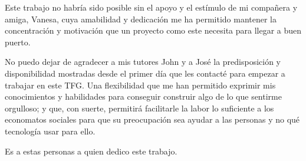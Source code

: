 \thispagestyle{empty}
\vspace{1cm}

\par Este trabajo no habría sido posible sin el apoyo y el estímulo de mi compañera y amiga, Vanesa, cuya amabilidad y dedicación me ha permitido mantener la concentración y motivación que un proyecto como este necesita para llegar a buen puerto.
\vspace{1em}
\par No puedo dejar de agradecer a mis tutores John y a José la predisposición y disponibilidad mostradas desde el primer día que les contacté para empezar a trabajar en este TFG. Una flexibilidad que me han permitido exprimir mis conocimientos y habilidades para conseguir construir algo de lo que sentirme orgulloso; y que, con suerte, permitirá facilitarle la labor lo suficiente a los economatos sociales para que su preocupación sea ayudar a las personas y no qué tecnología usar para ello.
\vspace{1em}
\par Es a estas personas a quien dedico este trabajo.

\cleardoublepage %


